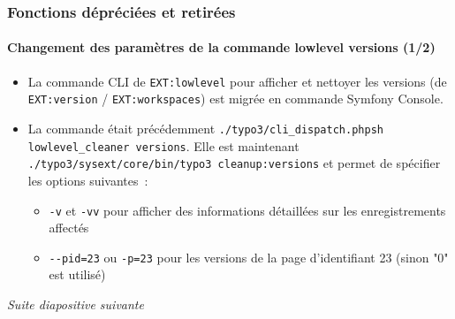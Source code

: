 \begin{frame}[fragile]
	\frametitle{Fonctions dépréciées et retirées}
	\framesubtitle{Changement des paramètres de la commande lowlevel versions (1/2)}

	\begin{itemize}
		\item La commande CLI de \texttt{EXT:lowlevel} pour afficher et nettoyer les versions (de
			\texttt{EXT:version} / \texttt{EXT:workspaces}) est migrée en commande Symfony Console.

		\item La commande était précédemment \texttt{./typo3/cli\_dispatch.phpsh lowlevel\_cleaner versions}.
			Elle est maintenant \texttt{./typo3/sysext/core/bin/typo3 cleanup:versions} et permet de spécifier
			les options suivantes~:

			\begin{itemize}
				\item \texttt{-v} et \texttt{-vv} pour afficher des informations détaillées sur les
					enregistrements affectés
				\item \texttt{-}\texttt{-pid=23} ou \texttt{-p=23} pour les versions de la page d'identifiant 23
					(sinon "0" est utilisé)
			\end{itemize}

	\end{itemize}

	\small\textit{Suite diapositive suivante}\normalsize

\end{frame}


